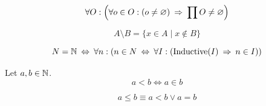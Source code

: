 \documentclass{main}
\begin{document}
\begin{axiom}[Choice]
$$
	\forall O:\mleft(
		\forall o\in O:(
			o\neq\varnothing
		)
		\Rightarrow
		\prod O\neq\varnothing
	\mright)
$$
\end{axiom}

\begin{definition}[Exclusion]
$$
	A\setminus B
	=
	\{
		x\in A
		\mid
		x\notin B
	\}
$$
\end{definition}

\begin{definition}
$$
	N=\N
	\Leftrightarrow
	\forall n:(
		n\in N
		\Leftrightarrow
		\forall I:(
			\operatorname{Inductive}(I)
			\Rightarrow
			n\in I
		)
	)
$$
\end{definition}

\begin{definition}
Let $a,b\in\mathbb{N}$.
$$
	a<b
	\Leftrightarrow
	a\in b
$$
\end{definition}

\begin{notation}
$$
	a\leq b
	\equiv
	a<b
	\lor
	a=b
$$
\end{notation}


\end{document}
